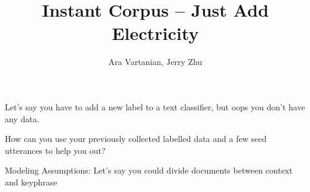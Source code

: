 \documentclass[12pt]{beamer}
\title{Instant Corpus -- Just Add Electricity}
\author[Author]{Ara Vartanian, Jerry Zhu}
\institute{Department of Computer Sciences, University of Wisconsin-Madison}
\begin{document}
\begin{frame}
  \titlepage
\end{frame}

\begin{frame}{}
  Let's say you have to add a new label to a text classifier, but oops you don't have any data.
\end{frame} 

\begin{frame}{}
  How can you use your previously collected labelled data and a few seed utterances to help you out?
\end{frame} 

\begin{frame}{}
  Modeling Assumptions: Let's say you could divide documents between context and keyphrase
\end{frame} 





\end{document}
